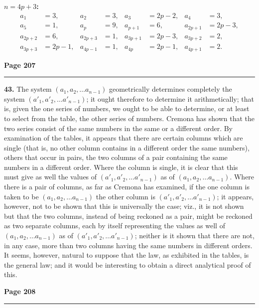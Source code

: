 \documentclass[12pt,a4paper]{article}
\theoremstyle{plain}
\theoremstyle{definition}
\theoremstyle{remark}
\begin{document}
\noindent\textbf{$n = 4p + 3$:}
\begin{align*}
a_1 &= 3, & a_2 &= 3, & a_3 &= 2p - 2, & a_4 &= 3, \\
a_5 &= 1, & a_p &= 9, & a_{p+1} &= 6, & a_{2p+1} &= 2p - 3, \\
a_{2p+2} &= 6, & a_{2p+3} &= 1, & a_{3p+1} &= 2p - 3, & a_{3p+2} &= 2, \\
a_{3p+3} &= 2p - 1, & a_{4p-1} &= 1, & a_{4p} &= 2p - 1, & a_{4p+1} &= 2.
\end{align*}

\newpage
\noindent\textbf{Page 207}\\
\noindent\rule{\textwidth}{0.4pt}

\smallskip

\noindent\textbf{43.} The system $(a_1, a_2, \ldots a_{n-1})$ geometrically determines completely the system $(a'_1, a'_2, \ldots a'_{n-1})$; it ought therefore to determine it arithmetically; that is, given the one series of numbers, we ought to be able to determine, or at least to select from the table, the other series of numbers. Cremona has shown that the two series consist of the same numbers in the same or a different order. By examination of the tables, it appears that there are certain columns which are single (that is, no other column contains in a different order the same numbers), others that occur in pairs, the two columns of a pair containing the same numbers in a different order. Where the column is single, it is clear that this must give as well the values of $(a'_1, a'_2, \ldots a'_{n-1})$ as of $(a_1, a_2, \ldots a_{n-1})$. Where there is a pair of columns, as far as Cremona has examined, if the one column is taken to be $(a_1, a_2, \ldots a_{n-1})$ the other column is $(a'_1, a'_2, \ldots a'_{n-1})$; it appears, however, not to be shown that this is universally the case; viz., it is not shown but that the two columns, instead of being reckoned as a pair, might be reckoned as two separate columns, each by itself representing the values as well of $(a_1, a_2, \ldots a_{n-1})$ as of $(a'_1, a'_2, \ldots a'_{n-1})$; neither is it shown that there are not, in any case, more than two columns having the same numbers in different orders. It seems, however, natural to suppose that the law, as exhibited in the tables, is the general law; and it would be interesting to obtain a direct analytical proof of this.

\newpage
\noindent\textbf{Page 208}\\
\noindent\rule{\textwidth}{0.4pt}
\end{document}
